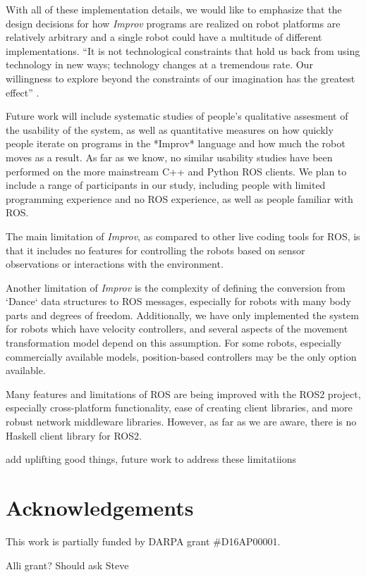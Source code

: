 \documentclass[sigconf]{acmart}
\begin{document}
With all of these implementation details, we would like to emphasize
that the design decisions for how \emph{Improv} programs are realized on
robot platforms are relatively arbitrary and a single robot could have a
multitude of different implementations. ``It is not technological
constraints that hold us back from using technology in new ways;
technology changes at a tremendous rate. Our willingness to explore
beyond the constraints of our imagination has the greatest effect''
\cite{schiphorst}.

Future work will include systematic studies of people's qualitative assesment of
the usability of the system, as well as quantitative measures on how quickly
people iterate on programs in the *Improv* language and how much the robot moves
as a result. As far as we know, no similar usability studies have been performed
on the more mainstream C++ and Python ROS clients. We plan to include a range of
participants in our study, including people with limited programming experience
and no ROS experience, as well as people familiar with ROS.

The main limitation of \emph{Improv}, as compared to other live coding tools for
ROS, is that it includes no features for controlling the robots based on sensor
observations or interactions with the environment.

Another limitation of \emph{Improv} is the complexity of defining the conversion
from `Dance` data structures to ROS messages, especially for robots with many
body parts and degrees of freedom. Additionally, we have only implemented the
system for robots which have velocity controllers, and several aspects of the
movement transformation model depend on this assumption. For some robots,
especially commercially available models, position-based controllers may be the
only option available.

Many features and limitations of ROS are being improved with the ROS2 project,
especially cross-platform functionality, ease of creating client libraries, and
more robust network middleware libraries. However, as far as we are aware, there
is no Haskell client library for ROS2.

{\color{red}add uplifting good things, future work to address these limitatiions}

\section{Acknowledgements}

This work is partially funded by DARPA grant \#D16AP00001.

{\color{red} Alli grant? Should ask Steve}



\end{document}
